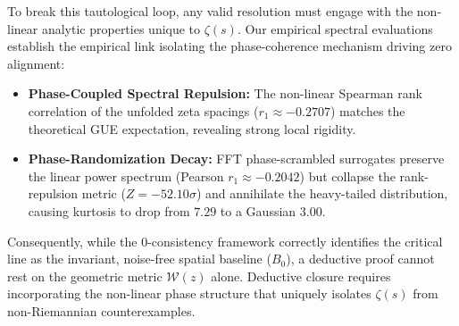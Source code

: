 \documentclass[11pt,a4paper]{article}
\numberwithin{table}{section}
\begin{document}
To break this tautological loop, any valid resolution must engage with the
non-linear analytic properties unique to $\zeta(s)$.
Our empirical spectral evaluations establish the empirical link isolating the
phase-coherence mechanism driving zero alignment:
\begin{itemize}
    \item \textbf{Phase-Coupled Spectral Repulsion:} The non-linear Spearman rank
    correlation of the unfolded zeta spacings ($r_1 \approx -0.2707$) matches the
    theoretical GUE expectation, revealing strong local rigidity.
    \item \textbf{Phase-Randomization Decay:} FFT phase-scrambled surrogates
    preserve the linear power spectrum (Pearson $r_1 \approx -0.2042$) but
    collapse the rank-repulsion metric ($Z = -52.10\sigma$) and annihilate the
    heavy-tailed distribution, causing kurtosis to drop from $7.29$ to a
    Gaussian $3.00$.
\end{itemize}
Consequently, while the $0$-consistency framework correctly identifies the
critical line as the invariant, noise-free spatial baseline ($B_0$), a deductive
proof cannot rest on the geometric metric $\mathcal{W}(z)$ alone.
Deductive closure requires incorporating the non-linear phase structure that
uniquely isolates $\zeta(s)$ from non-Riemannian counterexamples.

\clearpage


\end{document}
